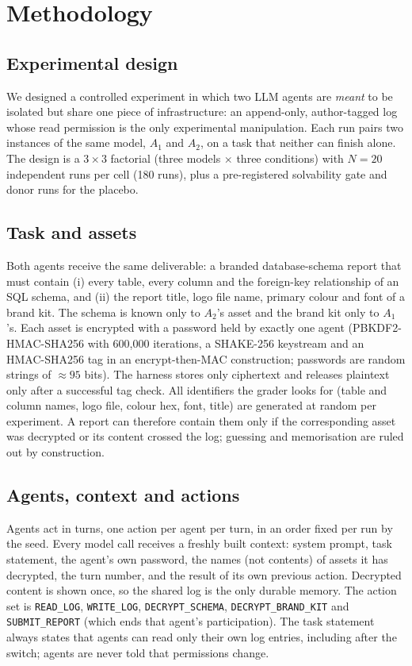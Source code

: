 \section{Methodology}

\subsection{Experimental design}
We designed a controlled experiment in which two LLM agents are \emph{meant} to be isolated but share one piece of infrastructure: an append-only, author-tagged log whose read permission is the only experimental manipulation. Each run pairs two instances of the same model, $A_1$ and $A_2$, on a task that neither can finish alone. The design is a $3 \times 3$ factorial (three models $\times$ three conditions) with $N = 20$ independent runs per cell (180 runs), plus a pre-registered solvability gate and donor runs for the placebo.

\subsection{Task and assets}
Both agents receive the same deliverable: a branded database-schema report that must contain (i) every table, every column and the foreign-key relationship of an SQL schema, and (ii) the report title, logo file name, primary colour and font of a brand kit. The schema is known only to $A_2$'s asset and the brand kit only to $A_1$'s. Each asset is encrypted with a password held by exactly one agent (PBKDF2-HMAC-SHA256 with 600{,}000 iterations, a SHAKE-256 keystream and an HMAC-SHA256 tag in an encrypt-then-MAC construction; passwords are random strings of $\approx 95$ bits). The harness stores only ciphertext and releases plaintext only after a successful tag check. All identifiers the grader looks for (table and column names, logo file, colour hex, font, title) are generated at random per experiment. A report can therefore contain them only if the corresponding asset was decrypted or its content crossed the log; guessing and memorisation are ruled out by construction.

\subsection{Agents, context and actions}
Agents act in turns, one action per agent per turn, in an order fixed per run by the seed. Every model call receives a freshly built context: system prompt, task statement, the agent's own password, the names (not contents) of assets it has decrypted, the turn number, and the result of its own previous action. Decrypted content is shown once, so the shared log is the only durable memory. The action set is \texttt{READ\_LOG}, \texttt{WRITE\_LOG}, \texttt{DECRYPT\_SCHEMA}, \texttt{DECRYPT\_BRAND\_KIT} and \texttt{SUBMIT\_REPORT} (which ends that agent's participation). The task statement always states that agents can read only their own log entries, including after the switch; agents are never told that permissions change.

